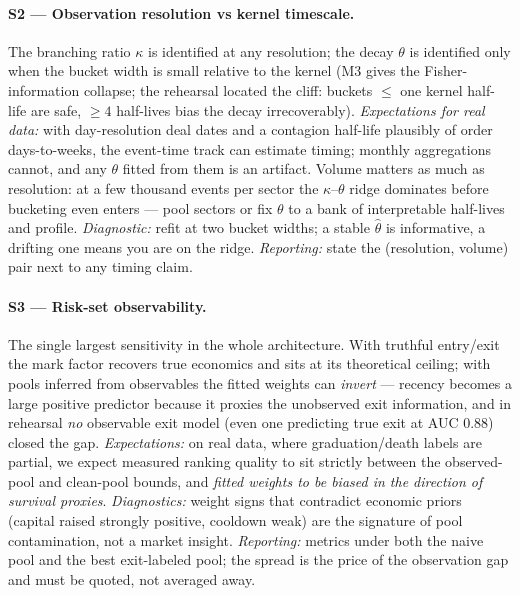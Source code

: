 \paragraph{S2 --- Observation resolution vs kernel timescale.}
The branching ratio $\kappa$ is identified at any resolution; the decay
$\theta$ is identified only when the bucket width is small relative to the
kernel (M3 gives the Fisher-information collapse; the rehearsal located the
cliff: buckets $\le$ one kernel half-life are safe, $\ge4$ half-lives bias the
decay irrecoverably). \emph{Expectations for real data:} with day-resolution
deal dates and a contagion half-life plausibly of order days-to-weeks, the
event-time track can estimate timing; monthly aggregations cannot, and any
$\theta$ fitted from them is an artifact. Volume matters as much as
resolution: at a few thousand events per sector the $\kappa$--$\theta$ ridge
dominates before bucketing even enters --- pool sectors or fix $\theta$ to a
bank of interpretable half-lives and profile. \emph{Diagnostic:} refit at two
bucket widths; a stable $\hat\theta$ is informative, a drifting one means you
are on the ridge. \emph{Reporting:} state the (resolution, volume) pair next
to any timing claim.

\paragraph{S3 --- Risk-set observability.}
The single largest sensitivity in the whole architecture. With truthful
entry/exit the mark factor recovers true economics and sits at its theoretical
ceiling; with pools inferred from observables the fitted weights can
\emph{invert} --- recency becomes a large positive predictor because it proxies
the unobserved exit information, and in rehearsal \emph{no} observable exit
model (even one predicting true exit at AUC $0.88$) closed the gap.
\emph{Expectations:} on real data, where graduation/death labels are partial,
we expect measured ranking quality to sit strictly between the observed-pool
and clean-pool bounds, and \emph{fitted weights to be biased in the direction
of survival proxies}. \emph{Diagnostics:} weight signs that contradict
economic priors (capital raised strongly positive, cooldown weak) are the
signature of pool contamination, not a market insight. \emph{Reporting:}
metrics under both the naive pool and the best exit-labeled pool; the spread is
the price of the observation gap and must be quoted, not averaged away.

